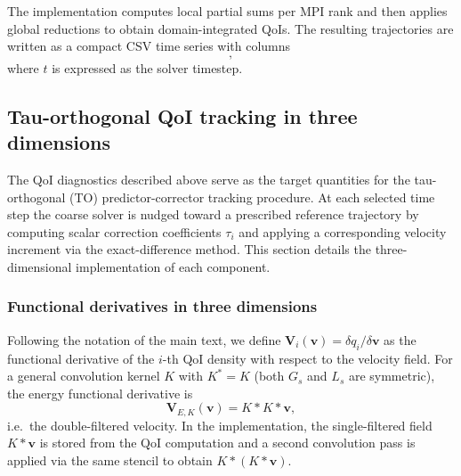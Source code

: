\documentclass[]{elsarticle}
\begin{document}
The implementation computes local partial sums per MPI rank and then applies global reductions to obtain domain-integrated QoIs. The resulting trajectories are written as a compact CSV time series with columns
\begin{equation}
    [t, E_{G_3}, E_{L_3}, E_{L_1}, Z_{G_3}, Z_{L_3}, Z_{L_1}],
\end{equation}
where $t$ is expressed as the solver timestep.

\subsection{Tau-orthogonal QoI tracking in three dimensions}
\label{sec:tau-orthogonal-3d}

The QoI diagnostics described above serve as the target quantities for the tau-orthogonal (TO) predictor-corrector tracking procedure. At each selected time step the coarse solver is nudged toward a prescribed reference trajectory by computing scalar correction coefficients $\tau_i$ and applying a corresponding velocity increment via the exact-difference method. This section details the three-dimensional implementation of each component.

\subsubsection{Functional derivatives in three dimensions}

Following the notation of the main text, we define $\mathbf{V}_i(\boldsymbol{v}) = \delta q_i / \delta \boldsymbol{v}$ as the functional derivative of the $i$-th QoI density with respect to the velocity field. For a general convolution kernel $K$ with $K^* = K$ (both $G_s$ and $L_s$ are symmetric), the energy functional derivative is
\begin{equation}
    \mathbf{V}_{E,K}(\boldsymbol{v}) = K * K * \boldsymbol{v},
\end{equation}
i.e.\ the double-filtered velocity. In the implementation, the single-filtered field $K*\boldsymbol{v}$ is stored from the QoI computation and a second convolution pass is applied via the same stencil to obtain $K*(K*\boldsymbol{v})$.
\end{document}
